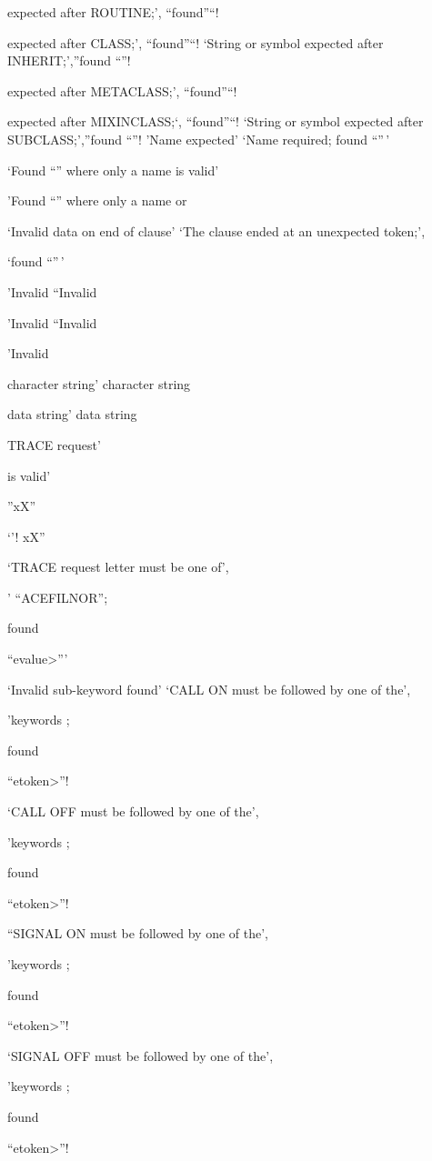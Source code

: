 expected after ROUTINE;', ``found''``!

expected after CLASS;', ``found''``! `String or symbol expected after
INHERIT;',''found ``''!

expected after METACLASS;', ``found''``!

expected after MIXINCLASS;`, ``found''``! `String or symbol expected
after SUBCLASS;',''found ``''! 'Name expected' `Name required; found
``''\,'

`Found ``'' where only a name is valid'

'Found ``'' where only a name or

`Invalid data on end of clause' `The clause ended at an unexpected
token;',

`found ``''\,'

'Invalid ``Invalid

'Invalid ``Invalid

'Invalid

character string' character string

data string' data string

TRACE request'

is valid'

''xX''

`'! xX''

`TRACE request letter must be one of',

' ``ACEFILNOR'';

found

``evalue\textgreater{}'''

`Invalid sub-keyword found' `CALL ON must be followed by one of the',

'keywords ;

found

``etoken\textgreater{}''!

`CALL OFF must be followed by one of the',

'keywords ;

found

``etoken\textgreater{}''!

``SIGNAL ON must be followed by one of the',

'keywords ;

found

``etoken\textgreater{}''!

`SIGNAL OFF must be followed by one of the',

'keywords ;

found

``etoken\textgreater{}''!


